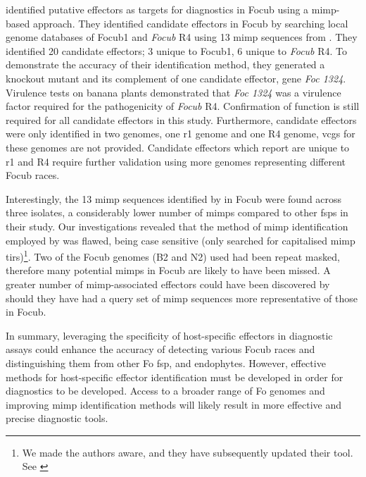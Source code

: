 \textcite{Chang2020} identified putative effectors as targets for diagnostics in \ac{Focub} using a \ac{mimp}-based approach. They identified candidate effectors in \ac{Focub} by searching local genome databases of \ac{Focub1} and \textit{Focub} R4 using 13 \ac{mimp} sequences from \textcite{Dam2016}. They identified 20 candidate effectors; 3 unique to \ac{Focub1}, 6 unique to \textit{Focub} R4. To demonstrate the accuracy of their identification method, they generated a knockout mutant and its complement of one candidate effector, gene \textit{Foc 1324}. Virulence tests on banana plants demonstrated that \textit{Foc 1324} was a virulence factor required for the pathogenicity of \textit{Focub} R4. Confirmation of function is still required for all candidate effectors in this study. Furthermore, candidate effectors were only identified in two genomes, one \ac{r1} genome and one R4 genome, \acp{vcg} for these genomes are not provided. Candidate effectors which \textcite{Chang2020} report are unique to \ac{r1} and R4 require further validation using more genomes representing different \ac{Focub} races.

Interestingly, the 13 mimp sequences identified by \textcite{Dam2016} in \ac{Focub} were found across three isolates, a considerably lower number of \acp{mimp} compared to other \acp{fsp} in their study. Our investigations revealed that the method of \ac{mimp} identification employed by \textcite{Dam2016} was flawed, being case sensitive (only searched for capitalised \ac{mimp} \acp{tir})\footnote{We made the authors aware, and they have subsequently updated their tool. See \textcite{FoEC2} }. Two of the \ac{Focub} genomes (B2 and N2) used had been repeat masked, therefore many potential \acp{mimp} in \ac{Focub} are likely to have been missed. A greater number of \ac{mimp}-associated effectors could have been discovered by \textcite{Chang2020} should they have had a query set of \ac{mimp} sequences more representative of those in \ac{Focub}.

In summary, leveraging the specificity of host-specific effectors in diagnostic assays could enhance the accuracy of detecting various \ac{Focub} races and distinguishing them from other \ac{Fo} \ac{fsp}, and endophytes. However, effective methods for host-specific effector identification must be developed in order for diagnostics to be developed. Access to a broader range of \ac{Fo} genomes and improving \ac{mimp} identification methods will likely result in more effective and precise diagnostic tools.

